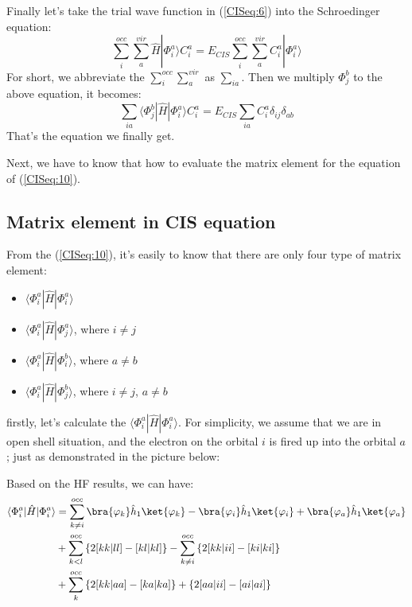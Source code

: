 Finally let's take the trial wave function in (\ref{CISeq:6}) into the
Schroedinger equation:
\begin{equation}
  \label{CISeq:9}
  \sum_{i}^{occ}\sum_{a}^{vir}\hat{H}|\Phi_{i}^{a}\rangle C_{i}^{a} = 
E_{CIS} \sum_{i}^{occ}\sum_{a}^{vir}C_{i}^{a}|\Phi_{i}^{a}\rangle
\end{equation}
For short, we abbreviate the $\sum_{i}^{occ}\sum_{a}^{vir}$ as
$\sum_{ia}$. Then we multiply $\Phi_{j}^{b}$ to the above equation, it
becomes: 
\begin{equation}
  \label{CISeq:10}
 \sum_{ia}\langle\Phi_{j}^{b}|\hat{H}|\Phi_{i}^{a}\rangle C_{i}^{a}
 = E_{CIS}\sum_{ia}C_{i}^{a}\delta_{ij}\delta_{ab}
\end{equation}
That's the equation we finally get.

Next, we have to know that how to evaluate the matrix element for the
equation of (\ref{CISeq:10}).


\subsection{Matrix element in CIS equation}
\label{sec:ME_CIS}
%
%
%
%
From the (\ref{CISeq:10}), it's easily to know that there are only
four type of matrix element:
\begin{itemize}
\item $\langle\Phi_{i}^{a}|\hat{H}|\Phi_{i}^{a}\rangle$
\item $\langle\Phi_{i}^{a}|\hat{H}|\Phi_{j}^{a}\rangle$, where $i 
\neq j$
\item $\langle\Phi_{i}^{a}|\hat{H}|\Phi_{i}^{b}\rangle$, where $a 
\neq b$
\item $\langle\Phi_{i}^{a}|\hat{H}|\Phi_{j}^{b}\rangle$, where $i 
\neq j$, $a \neq b$
\end{itemize}

firstly, let's calculate the
$\langle\Phi_{i}^{a}|\hat{H}|\Phi_{i}^{a}\rangle$. For simplicity, we
assume that we are in open shell situation, and the electron on the
orbital $i$ is fired up into the orbital $a$; just as demonstrated in
the picture below:


Based on the HF results, we can have:
\begin{align}
\label{CISeq:11}
  \langle\Phi_{i}^{a}|\hat{H}|\Phi_{i}^{a}\rangle &= \sum_{k\neq
    i}^{occ} \bra{\varphi_{k}}\hat{h}_{1}\ket{\varphi_{k}} - 
\bra{\varphi_{i}}\hat{h}_{1}\ket{\varphi_{i}} + 
\bra{\varphi_{a}}\hat{h}_{1}\ket{\varphi_{a}} \nonumber \\
&+ \sum_{k<l}^{occ}\left\{2[kk|ll] - [kl|kl] \right\} - 
\sum_{k \neq i}^{occ}\left\{2[kk|ii] - [ki|ki] \right\} \nonumber \\
&+ \sum_{k}^{occ}\left\{2[kk|aa] - [ka|ka] \right\} + 
\left\{2[aa|ii] - [ai|ai] \right\}
\end{align}

